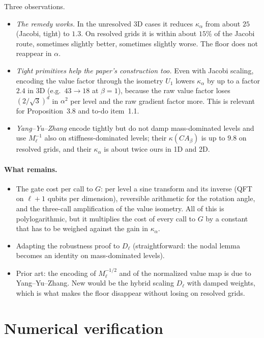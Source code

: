 \documentclass[11pt,a4paper]{article}
\begin{document}
Three observations.
\begin{itemize}
\item \emph{The remedy works.} In the unresolved 3D cases it reduces
  $\kappa_\alpha$ from about $25$ (Jacobi, tight) to $1.3$. On resolved grids it is within
  about $15\%$ of the Jacobi route, sometimes slightly better, sometimes
  slightly worse. The floor does not reappear in $\alpha$.
\item \emph{Tight primitives help the paper's construction too.} Even with
  Jacobi scaling, encoding the value factor through the isometry $U_1$ lowers
  $\kappa_\alpha$ by up to a factor $2.4$ in 3D (e.g.\ $43\to18$ at $\beta=1$), because the
  raw value factor loses $(2/\sqrt3)^d$ in $\alpha^2$ per level and the raw gradient
  factor more. This is relevant for Proposition~3.8 and to-do item~1.1.
\item \emph{Yang--Yu--Zhang} encode tightly but do not damp mass-dominated
  levels and use $M_\ell^{-1}$ also on stiffness-dominated levels; their
  $\kappa(CA_\beta)$ is up to $9.8$ on resolved grids, and their $\kappa_\alpha$ is about twice
  ours in 1D and 2D.
\end{itemize}

\paragraph{What remains.}
\begin{itemize}
\item The gate cost per call to $G$: per level a sine transform and its
  inverse (QFT on $\ell+1$ qubits per dimension), reversible arithmetic for the
  rotation angle, and the three-call amplification of the value isometry.
  All of this is polylogarithmic, but it multiplies the cost of every call
  to $G$ by a constant that has to be weighed against the gain in $\kappa_\alpha$.
\item Adapting the robustness proof to $D_\ell$ (straightforward: the
  nodal lemma becomes an identity on mass-dominated levels).
\item Prior art: the encoding of $M_\ell^{-1/2}$ and of the normalized value map
  is due to Yang--Yu--Zhang. New would be the hybrid scaling $D_\ell$ with damped
  weights, which is what makes the floor disappear without losing on
  resolved grids.
\end{itemize}

\section{Numerical verification}
\end{document}
